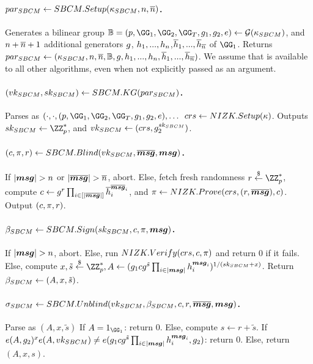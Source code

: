 \paragraph{$par_{SBCM} \gets SBCM.Setup(\kappa_{SBCM},n,\overline{n})$.} %
Generates a bilinear group $\BB = (p,\GG_1,\GG_2,\GG_T,\gen{g}_1,\gen{g}_2,e)
\gets \PGen(\SBCMsecpar)$, and $n+\overline{n}+1$ additional generators
$g$, $h_1,...,h_{n}$,$\overline{h}_1,...,\overline{h}_{\overline{n}}$
of $\GG_1$. Returns $par_{SBCM} \gets (\kappa_{SBCM},n,\overline{n},\mathbb{B},
g,h_1,...,h_{n},\overline{h}_1,...,\overline{h}_{\overline{n}})$.
We assume that \SBCMparm is available to all other algorithms, even when not
explicitly passed as an argument.

\paragraph{$(vk_{SBCM},sk_{SBCM}) \gets SBCM.KG(par_{SBCM})$.} %
Parses \SBCMparm as $(\cdot,\cdot,(p,\GG_1,\GG_2,\GG_T,\gen{g}_1,\gen{g}_2,e),
\dots$ $crs \gets NIZK.Setup(\kappa)$. Outputs $\SBCMsk \gets \ZZ^*_p$,
and $vk_{SBCM} \gets (crs,g_2^{sk_{SBCM}})$.

\paragraph{$(c,\pi,r) \gets SBCM.Blind(vk_{SBCM},\overline{\boldsymbol{msg}},\boldsymbol{msg})$.} %
If $|\smsg |>\nattrs$ or $|\osmsg|>\tnattrs$,
abort. Else, fetch fresh randomness $r \getr \ZZ^*_p$, compute $c \gets
g^r\prod_{i \in [|\overline{\boldsymbol{msg}}|]}\overline{h}_i^{\overline{\boldsymbol{msg}}_i}$,
and $\pi \gets NIZK.Prove(crs,(r,\overline{\boldsymbol{msg}}),c)$.
Output $(c,\pi,r)$.

\paragraph{$\beta_{SBCM} \gets SBCM.Sign(sk_{SBCM},c,\pi,\boldsymbol{msg})$.} %
If $|\smsg|>\nattrs$, abort. Else, run $NIZK.Verify(crs,c,\pi)$
and return $0$ if it fails. Else, compute $x,\tilde{s} \getr \ZZ^*_p, A \gets
(\gen{g}_1\Ccom \gen{g}^{\tilde{s}} \prod_{i \in |\smsg|}
\gen{h}_i^{\smsg_i})^{1/(\SBCMsk+x)}$. Return $\beta_{SBCM} \gets (A,x,\tilde{s})$.

\paragraph{$\sigma_{SBCM} \gets SBCM.Unblind(vk_{SBCM},\beta_{SBCM},c,r,
  \overline{\boldsymbol{msg}},\boldsymbol{msg})$.} %
Parse \SBCMbsig as $(A,x,\tilde{s})$
If $A = 1_{\GG_1}$: return $0$. Else, compute $s \gets r + \tilde{s}$. If
$e(A,g_2)^xe(A,vk_{SBCM}) \neq e(g_1cg^{\tilde{s}}
\prod_{i \in |\boldsymbol{msg}|}h_i^{\boldsymbol{msg}_i},g_2)$: return $0$. Else, return
$(A,x,s)$.

